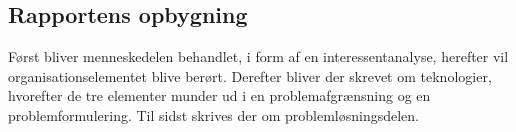 \subsection{Rapportens opbygning}\label{subsec:rapportens-opbygning}

Først bliver menneskedelen behandlet, i form af en interessentanalyse, herefter vil organisationselementet blive berørt. Derefter bliver der skrevet om teknologier,
hvorefter de tre elementer munder ud i en problemafgrænsning og en problemformulering. Til sidst skrives der
om problemløsningsdelen. 
